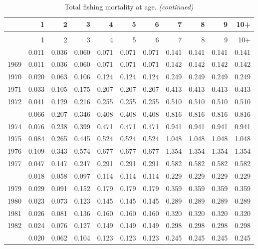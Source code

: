 \documentclass[
]{article}
\begin{document}
\begin{longtable}[t]{lrrrrrrrrrr}
\caption{\label{tab:FAA-tot-table}Total fishing mortality at age.}\\
\toprule
  & 1 & 2 & 3 & 4 & 5 & 6 & 7 & 8 & 9 & 10+\\
\midrule
\endfirsthead
\caption[]{Total fishing mortality at age. \textit{(continued)}}\\
\toprule
  & 1 & 2 & 3 & 4 & 5 & 6 & 7 & 8 & 9 & 10+\\
\midrule
\endhead

\endfoot
\bottomrule
\endlastfoot
1968 & 0.011 & 0.036 & 0.060 & 0.071 & 0.071 & 0.071 & 0.141 & 0.141 & 0.141 & 0.141\\
1969 & 0.011 & 0.036 & 0.060 & 0.071 & 0.071 & 0.071 & 0.142 & 0.142 & 0.142 & 0.142\\
1970 & 0.020 & 0.063 & 0.106 & 0.124 & 0.124 & 0.124 & 0.249 & 0.249 & 0.249 & 0.249\\
1971 & 0.033 & 0.105 & 0.175 & 0.207 & 0.207 & 0.207 & 0.413 & 0.413 & 0.413 & 0.413\\
1972 & 0.041 & 0.129 & 0.216 & 0.255 & 0.255 & 0.255 & 0.510 & 0.510 & 0.510 & 0.510\\
\addlinespace
1973 & 0.066 & 0.207 & 0.346 & 0.408 & 0.408 & 0.408 & 0.816 & 0.816 & 0.816 & 0.816\\
1974 & 0.076 & 0.238 & 0.399 & 0.471 & 0.471 & 0.471 & 0.941 & 0.941 & 0.941 & 0.941\\
1975 & 0.084 & 0.265 & 0.445 & 0.524 & 0.524 & 0.524 & 1.048 & 1.048 & 1.048 & 1.048\\
1976 & 0.109 & 0.343 & 0.574 & 0.677 & 0.677 & 0.677 & 1.354 & 1.354 & 1.354 & 1.354\\
1977 & 0.047 & 0.147 & 0.247 & 0.291 & 0.291 & 0.291 & 0.582 & 0.582 & 0.582 & 0.582\\
\addlinespace
1978 & 0.018 & 0.058 & 0.097 & 0.114 & 0.114 & 0.114 & 0.229 & 0.229 & 0.229 & 0.229\\
1979 & 0.029 & 0.091 & 0.152 & 0.179 & 0.179 & 0.179 & 0.359 & 0.359 & 0.359 & 0.359\\
1980 & 0.023 & 0.073 & 0.123 & 0.145 & 0.145 & 0.145 & 0.289 & 0.289 & 0.289 & 0.289\\
1981 & 0.026 & 0.081 & 0.136 & 0.160 & 0.160 & 0.160 & 0.320 & 0.320 & 0.320 & 0.320\\
1982 & 0.024 & 0.076 & 0.127 & 0.149 & 0.149 & 0.149 & 0.298 & 0.298 & 0.298 & 0.298\\
\addlinespace
1983 & 0.020 & 0.062 & 0.104 & 0.123 & 0.123 & 0.123 & 0.245 & 0.245 & 0.245 & 0.245\\

\end{longtable}
\end{document}
